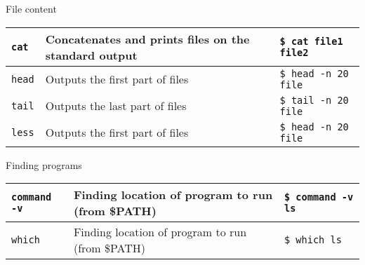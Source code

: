 \documentclass{beamer}
\let\tt\texttt
\begin{document}
\begin{frame}{File content}
        \begin{tabular}{p{} p{} p{}}
                \hline
                \tt{cat}             &
                Concatenates and prints files on the standard output &
                \tt{\$ cat file1 file2}       \\
                \hline
                \tt{head}             &
                Outputs the first part of files &
                \tt{\$ head -n 20 file}       \\
                \hline
                \tt{tail}             &
                Outputs the last part of files &
                \tt{\$ tail -n 20 file}       \\
                \hline
                \tt{less}             &
                Outputs the first part of files &
                \tt{\$ head -n 20 file}       \\
                \hline
        \end{tabular}  
\end{frame}

\begin{frame}{Finding programs}
        \begin{tabular}{p{} p{} p{}}
                \hline
                \tt{command -v}             &
                Finding location of program to run (from \$PATH) &
                \tt{\$ command -v ls}       \\
                \hline
                \tt{which}             &
                Finding location of program to run (from \$PATH) &
                \tt{\$ which ls}       \\
                \hline
        \end{tabular}
\end{frame}
\end{document}
